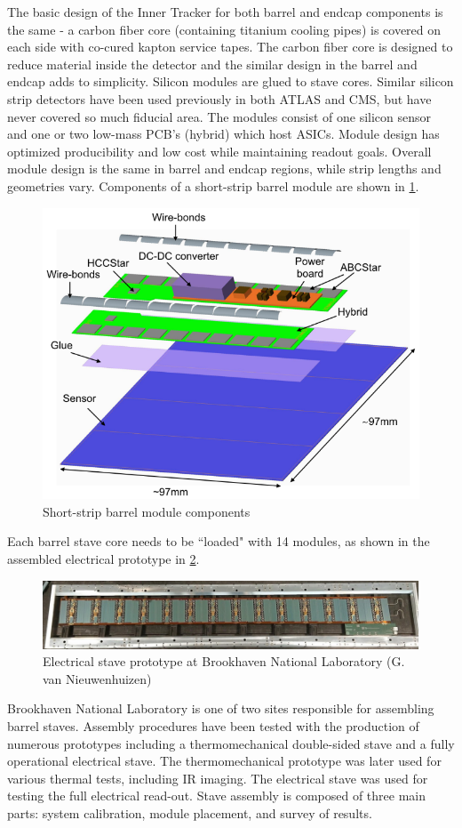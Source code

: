 The basic design of the Inner Tracker for both barrel and endcap components is the same - a carbon fiber core (containing titanium cooling pipes) is covered on each side with co-cured kapton service tapes. The carbon fiber core is designed to reduce material inside the detector and the similar design in the barrel and endcap adds to simplicity. Silicon modules are glued to stave cores. Similar silicon strip detectors have been used previously in both ATLAS and CMS, but have never covered so much fiducial area. The modules consist of one silicon sensor and one or two low-mass PCB's (hybrid) which host ASICs. Module design has optimized producibility and low cost while maintaining readout goals. Overall module design is the same in barrel and endcap regions, while strip lengths and geometries vary. Components of a short-strip barrel module are shown in \ref{fig:module}.
\begin{figure}[!h]
        \centering
    \includegraphics[width=.4\textwidth]{Pictures/ITkmodule.png}
    \caption{Short-strip barrel module components \cite{ITktech}}
    \label{fig:module}
\end{figure}
 
Each barrel stave core needs to be ``loaded" with 14 modules, as shown in the assembled electrical prototype in \ref{fig:stave}. 

\begin{figure}[!h]
        \centering
    \includegraphics[width=.8\textwidth]{Pictures/electricalstave.png}
    \caption{Electrical stave prototype at Brookhaven National Laboratory (G. van Nieuwenhuizen)}
    \label{fig:stave}
\end{figure}

Brookhaven National Laboratory is one of two sites responsible for assembling barrel staves. Assembly procedures have been tested with the production of numerous prototypes including a thermomechanical double-sided stave and a fully operational electrical stave. The thermomechanical prototype was later used for various thermal tests, including IR imaging. The electrical stave was used for testing the full electrical read-out. Stave assembly is composed of three main parts: system calibration, module placement, and survey of results. 

